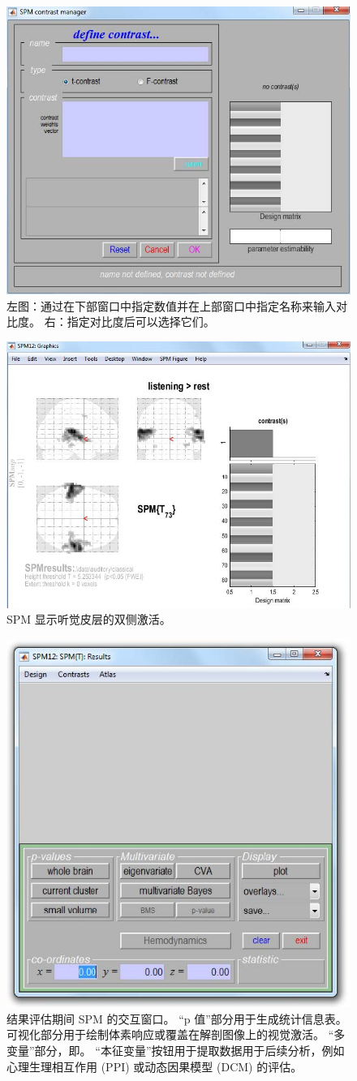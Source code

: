 \begin{figure}[htbp]
	\centering
	\includegraphics[width=0.6\linewidth]{part7/figs/fig_30_12}
	\caption{左图：通过在下部窗口中指定数值并在上部窗口中指定名称来输入对比度。 右：指定对比度后可以选择它们。}
	\label{fig_30_12}
\end{figure}

\begin{figure}[htbp]
	\centering
	\includegraphics[width=0.6\linewidth]{part7/figs/fig_30_13}
	\caption{SPM 显示听觉皮层的双侧激活。}
	\label{fig_30_13}
\end{figure}

\begin{figure}[htbp]
	\centering
	\includegraphics[width=0.6\linewidth]{part7/figs/fig_30_14}
	\caption{结果评估期间 SPM 的交互窗口。 “p 值”部分用于生成统计信息表。 可视化部分用于绘制体素响应或覆盖在解剖图像上的视觉激活。 “多变量”部分，即。 “本征变量”按钮用于提取数据用于后续分析，例如心理生理相互作用 (PPI) 或动态因果模型 (DCM) 的评估。}
	\label{fig_30_14}
\end{figure}

